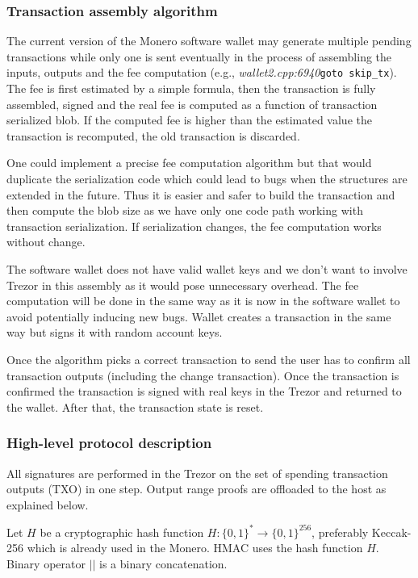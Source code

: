 \documentclass[]{article}
\begin{document}
\subsubsection{Transaction assembly algorithm}

The current version of the Monero software wallet may generate multiple pending transactions while only one is sent eventually in the process of assembling the inputs, outputs and the fee computation (e.g., \emph{wallet2.cpp:6940}\;\verb|goto skip_tx|). The fee is first estimated by a simple formula, then the transaction is fully assembled, signed and the real fee is computed as a function of transaction serialized blob. If the computed fee is higher than the  estimated value the transaction is recomputed, the old transaction is discarded.

One could implement a precise fee computation algorithm but that would duplicate the serialization code which could lead to bugs when the structures are extended in the future. Thus it is easier and safer to build the transaction and then compute the blob size as we have only one code path working with transaction serialization. If serialization changes, the fee computation works without change.

The software wallet does not have valid wallet keys and we don't want to involve Trezor in this assembly as it would pose unnecessary overhead. The fee computation will be done in the same way as it is now in the software wallet to avoid potentially inducing new bugs. Wallet creates a transaction in the same way but signs it with random account keys. 

Once the algorithm picks a correct transaction to send the user has to confirm all transaction outputs (including the change transaction). Once the transaction is confirmed the transaction is signed with real keys in the Trezor and returned to the wallet. After that, the transaction state is reset.


\subsubsection{High-level protocol description} 
All signatures are performed in the Trezor on the set of spending transaction outputs (TXO) in one step. Output range proofs are offloaded to the host as explained below.

Let $H$ be a cryptographic hash function $H : \{0,1\}^* \rightarrow \{0,1\}^{256}$, preferably Keccak-256 which is already used in the Monero. HMAC uses the hash function $H$. Binary operator $||$ is a binary concatenation.
\end{document}
